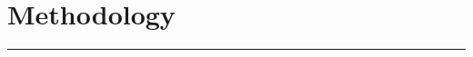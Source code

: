 \pagebreak

\section{Methodology}\label{section2}
\noindent\rule{\textwidth}{1pt}
\begin{multicols}{2}
    
    
    
    
    
    
    
    
    
    
    
    
    
\end{multicols}